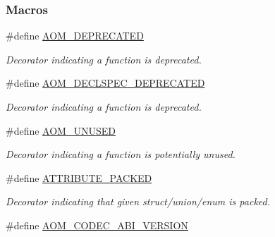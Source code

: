 \subsubsection*{Macros}
\begin{DoxyCompactItemize}
\item 
\#define \hyperlink{group__codec_gac06f52752a93708c56eb660f27601b00}{A\+O\+M\+\_\+\+D\+E\+P\+R\+E\+C\+A\+T\+ED}\hypertarget{group__codec_gac06f52752a93708c56eb660f27601b00}{}\label{group__codec_gac06f52752a93708c56eb660f27601b00}

\begin{DoxyCompactList}\small\item\em Decorator indicating a function is deprecated. \end{DoxyCompactList}\item 
\#define \hyperlink{group__codec_gad4bd9523583de840a940dbedb6a34d58}{A\+O\+M\+\_\+\+D\+E\+C\+L\+S\+P\+E\+C\+\_\+\+D\+E\+P\+R\+E\+C\+A\+T\+ED}
\begin{DoxyCompactList}\small\item\em Decorator indicating a function is deprecated. \end{DoxyCompactList}\item 
\#define \hyperlink{group__codec_ga999502c6c00ce4c54d0069265a31d2bb}{A\+O\+M\+\_\+\+U\+N\+U\+S\+ED}\hypertarget{group__codec_ga999502c6c00ce4c54d0069265a31d2bb}{}\label{group__codec_ga999502c6c00ce4c54d0069265a31d2bb}

\begin{DoxyCompactList}\small\item\em Decorator indicating a function is potentially unused. \end{DoxyCompactList}\item 
\#define \hyperlink{group__codec_gad93e9ac33d1a9153bbea517a98260041}{A\+T\+T\+R\+I\+B\+U\+T\+E\+\_\+\+P\+A\+C\+K\+ED}\hypertarget{group__codec_gad93e9ac33d1a9153bbea517a98260041}{}\label{group__codec_gad93e9ac33d1a9153bbea517a98260041}

\begin{DoxyCompactList}\small\item\em Decorator indicating that given struct/union/enum is packed. \end{DoxyCompactList}\item 
\#define \hyperlink{group__codec_ga801627e3edca037cef7a92f7fecd75ef}{A\+O\+M\+\_\+\+C\+O\+D\+E\+C\+\_\+\+A\+B\+I\+\_\+\+V\+E\+R\+S\+I\+ON}\hypertarget{group__codec_ga801627e3edca037cef7a92f7fecd75ef}{}\label{group__codec_ga801627e3edca037cef7a92f7fecd75ef}


\end{DoxyCompactItemize}
